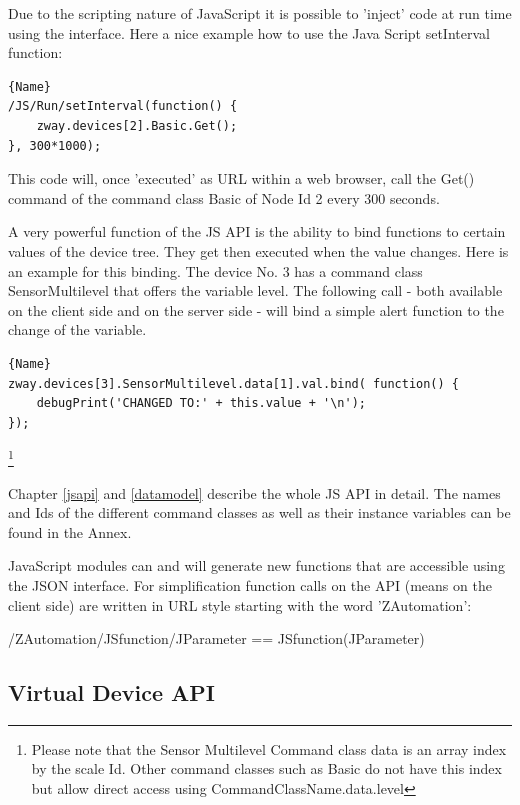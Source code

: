 Due to the scripting nature of JavaScript it is possible to 'inject' code at run time
using the interface. Here a nice example how to use the Java Script 
setInterval function:

\begin{lstlisting}[caption=Polling of device \#2]{Name}
/JS/Run/setInterval(function() { 
	zway.devices[2].Basic.Get();
}, 300*1000);
\end{lstlisting}

This code will, once 'executed' as URL within a web browser, call the Get() command
of the command class Basic of Node Id 2 every 300 seconds.  

A very powerful function of the JS API is the ability to bind functions to certain
values of the device tree. They get then executed when the value changes. Here is an 
example for this binding. The device No. 3 has a command class SensorMultilevel that offers
the variable level. The following call - both available on the client side 
and on the server side - will bind a simple alert function to the change of 
the variable.

\begin{lstlisting}[caption=Bind a function]{Name}
zway.devices[3].SensorMultilevel.data[1].val.bind( function() { 
	debugPrint('CHANGED TO:' + this.value + '\n'); 
});  
\end{lstlisting}\footnote{Please note that the Sensor Multilevel Command class data is an array
index by the scale Id. Other command classes such as Basic do not have this index but allow direct access using 
CommandClassName.data.level}

Chapter \ref{jsapi} and \ref{datamodel} describe the whole JS API in detail. The names 
and Ids of the different command classes as well as their instance variables can be found
in the Annex.

JavaScript modules can and will generate new functions that are accessible using the 
JSON interface. For simplification function calls on the API (means on the client
side) are written in URL style starting with the word 'ZAutomation':

\begin{center}
/ZAutomation/JSfunction/JParameter
== JSfunction(JParameter)
\end{center}

\subsection{Virtual Device API}

